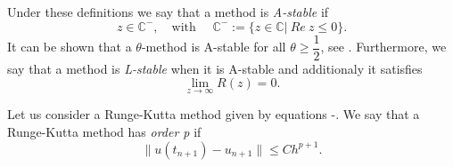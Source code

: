 Under these definitions we say that a method is \textit{A-stable} if 
\begin{equation}
\label{eq-C2_A_stable}
z\in\mathbb{C}^-,\quad\mbox{with $\quad\mathbb{C^-}:=\{z\in\mathbb{C}|\ Re\ z\le0\} $}.
\end{equation}
It can be shown that a $ \theta $-method is A-stable for all $ \theta\ge\dfrac{1}{2} $, see \cite{lambert_numerical_1991}. Furthermore, we say that a method is \textit{L-stable} when it is A-stable and additionaly it satisfies
\begin{equation}
\label{eq-C2_L_stable}
\lim_{z\rightarrow\infty}R(z)=0.
\end{equation}

Let us consider a Runge-Kutta method given by equations -. We say that a Runge-Kutta method has \textit{order p} if 
\begin{equation}
\label{eq-C2_time_RK_order}
\|u(t_{n+1})-u_{n+1}\|\le Ch^{p+1}.
\end{equation}